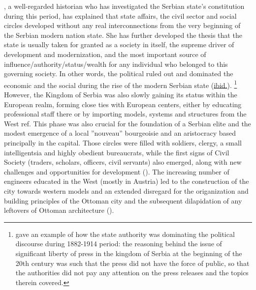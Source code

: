 \documentclass[11pt]{report}
\begin{document}
\href{Stojanovic}{\cite{stojanovic_ulje_2010}}, a well-regarded historian who has investigated the Serbian state’s constitution during this period, has explained that state affairs, the civil sector and social circles developed without any real interconnections from the very beginning of the Serbian modern nation state. She has further developed the thesis that the state is usually taken for granted as a society in itself, the supreme driver of development and modernization, and the most important source of influence/authority/status/wealth for any individual who belonged to this governing society. In other words, the political ruled out and dominated the economic and the social during the rise of the modern Serbian state  (\href{Stojanovic}{ibid.}).
\footnote{\href{Stojanovic}{\cite{stojanovic_ulje_2010}} gave an example of how the state authority was dominating the political discourse during 1882-1914 period: the reasoning behind the issue of significant liberty of press in the kingdom of Serbia at the beginning of the 20th century was such that the press did not have the force of public, so that the authorities did not pay any attention on the press releases and the topics therein covered.}
\\

However, the Kingdom of Serbia was also slowly gaining its status within the European realm, forming close ties with European centers, either by educating professional staff there or by importing models, systems and structures from the West ref. This phase was also crucial for 
the foundation of a Serbian elite and the modest emergence of a local ”nouveau” bourgeoisie and an aristocracy based principally in the capital. Those circles were filled with soldiers, clergy, a small intelligentsia and highly obedient bureaucrats, while the first signs of Civil Society (traders, scholars, officers, civil servants) also emerged, along with new challenges and opportunities for development (\href{Vukmirovic}{\citealt{vukmirovic_city_2013}}).
The increasing number of engineers educated in the West (mostly in Austria) led to the construction of the city towards western models and an extended disregard for the origanization and building principles of the Ottoman city and the subsequent dilapidation of any leftovers of Ottoman architecture (\href{Blagojevic}{\citealt{blagojevic_urban_2009}}).
\\
\end{document}
